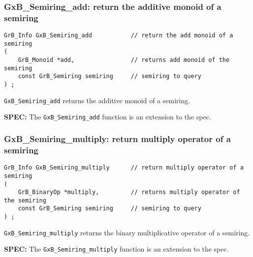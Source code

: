 \documentclass[12pt]{article}
\begin{document}
\subsubsection{{\sf GxB\_Semiring\_add:} return the additive monoid of a semiring}
\label{semiring_add}

\begin{mdframed}[userdefinedwidth=6in]
{\footnotesize
\begin{verbatim}
GrB_Info GxB_Semiring_add           // return the add monoid of a semiring
(
    GrB_Monoid *add,                // returns add monoid of the semiring
    const GrB_Semiring semiring     // semiring to query
) ;
\end{verbatim}
} \end{mdframed}

\verb'GxB_Semiring_add' returns the additive monoid of a semiring.

\begin{spec}
{\bf SPEC:} The \verb'GxB_Semiring_add' function is an extension to the spec.
\end{spec}

\newpage
\subsubsection{{\sf GxB\_Semiring\_multiply:} return multiply operator of a semiring}
\label{semiring_multiply}

\begin{mdframed}[userdefinedwidth=6in]
{\footnotesize
\begin{verbatim}
GrB_Info GxB_Semiring_multiply      // return multiply operator of a semiring
(
    GrB_BinaryOp *multiply,         // returns multiply operator of the semiring
    const GrB_Semiring semiring     // semiring to query
) ;
\end{verbatim}
} \end{mdframed}

\verb'GxB_Semiring_multiply' returns the binary multiplicative operator of a
semiring.

\begin{spec}
{\bf SPEC:} The \verb'GxB_Semiring_multiply' function is an extension to the spec.
\end{spec}
\end{document}
